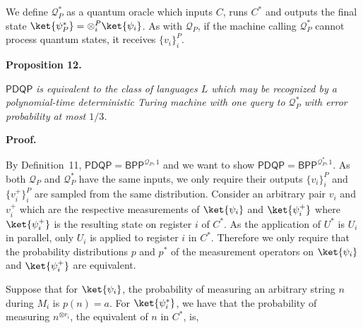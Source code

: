 \documentclass[10pt,a4paper]{article}
\begin{document}
We define $\mathcal{Q}_{P}^{*}$ as a quantum oracle which inputs $C$, runs $C^{*}$ and outputs the final state $\ket{\psi_{P}^{*}}=\otimes_{i}^{P}\ket{\psi_{i}}$. As with $\mathcal{Q}_{P}$, if the machine calling $\mathcal{Q}_{P}^{*}$ cannot process quantum states, it receives $\{v_{i}\}_{i}^{P}$.\par





\par\medskip\noindent\textbf{
\textbf{Proposition 12}\textbf{.}
}\par



$\mathsf{PDQP}$\emph{ is equivalent to the class of languages $L$ which may be recognized by a polynomial-time deterministic Turing machine with one query to $\mathcal{Q}_{P}^{*}$ with error probability at most $1/3$.}\par






\par\medskip\noindent\textbf{Proof.}\par




By Definition 11, $\mathsf{PDQP}=\mathsf{BPP}^{\mathcal{Q}_{P},1}$ and we want to show $\mathsf{PDQP}=\mathsf{BPP}^{\mathcal{Q}_{P}^{*},1}$. As both $\mathcal{Q}_{P}$ and $\mathcal{Q}_{P}^{*}$ have the same inputs, we only require their outputs $\{v_{i}\}_{i}^{P}$ and $\{v_{i}^{+}\}_{i}^{P}$ are sampled from the same distribution. Consider an arbitrary pair $v_{i}$ and $v_{i}^{+}$ which are the respective measurements of $\ket{\psi_{i}}$ and $\ket{\psi_{i}^{+}}$ where $\ket{\psi_{i}^{+}}$ is the resulting state on register $i$ of $C^{*}$. As the application of $U^{*}$ is $U_{i}$ in parallel, only $U_{i}$ is applied to register $i$ in $C^{*}$. Therefore we only require that the probability distributions $p$ and $p^{*}$ of the measurement operators on $\ket{\psi_{i}}$ and $\ket{\psi_{i}^{+}}$ are equivalent.\par




Suppose that for $\ket{\psi_{i}}$, the probability of measuring an arbitrary string $n$ during $M_{i}$ is $p(n)=a$. For $\ket{\psi_{i}^{*}}$, we have that the probability of measuring $n^{\otimes r_{i}}$, the equivalent of $n$ in $C^{*}$, is,\par
\end{document}
